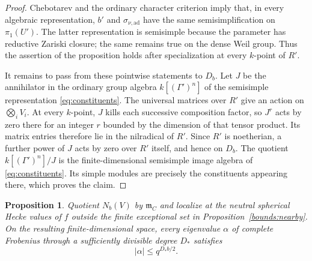 \documentclass[11pt]{article}
\numberwithin{equation}{section}
\newtheorem{proposition}[theorem]{Proposition}
\theoremstyle{definition}
\theoremstyle{remark}
\begin{document}
\begin{proof}
Chebotarev and the ordinary character criterion imply that, in every
algebraic representation, $b'$ and $\sigma_{\nu,\mathrm{ad}}$ have the
same semisimplification on $\pi_1(U')$.  The latter representation is
semisimple because the parameter has reductive Zariski closure; the
same remains true on the dense Weil group.  Thus the assertion of the
proposition holds after specialization at every $k$-point of $R'$.

It remains to pass from these pointwise statements to $D_b$.  Let
$J$ be the annihilator in the ordinary group algebra
$k[(\Gamma')^n]$ of the semisimple representation
\eqref{eq:constituents}.  The universal matrices over $R'$ give an
action on $\bigotimes_i V_i$.  At every $k$-point, $J$ kills each
successive composition factor, so $J^r$ acts by zero there for an
integer $r$ bounded by the dimension of that tensor product.  Its
matrix entries therefore lie in the nilradical of $R'$.  Since $R'$
is noetherian, a further power of $J$ acts by zero over $R'$ itself,
and hence on $D_b$.  The quotient $k[(\Gamma')^n]/J$ is the
finite-dimensional semisimple image algebra of
\eqref{eq:constituents}.  Its simple modules are precisely the
constituents appearing there, which proves the claim.
\end{proof}

\begin{proposition}\label{bounds:weight-bound}
Quotient $N_b(V)$ by $\mathfrak m_C$ and localize at the neutral
spherical Hecke values of $f$ outside the finite exceptional set in
Proposition~\ref{bounds:nearby}.  On the resulting finite-dimensional
space, every eigenvalue $\alpha$ of complete Frobenius through a
sufficiently divisible degree $D_*$ satisfies
\begin{equation}
 |\alpha|\leq q^{D_*b/2}.
 \label{bounds:frobenius-weight}
\end{equation}
\end{proposition}
\end{document}
